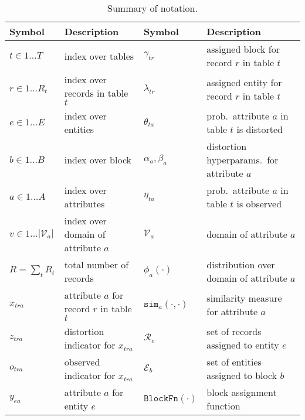 \documentclass[12pt,letterpaper]{article}
\newcommand{\simfn}{\mathtt{sim}} %
\newcommand{\blockfn}{\mathtt{BlockFn}} %
\newcommand{\valset}{\mathcal{V}} %
\newcommand{\entset}{\mathcal{R}} %
\newcommand{\partset}{\mathcal{E}} %
\newcommand{\1}[1]{\mathbb{I}\!\left[#1\right]} %
\def\spacingset#1{\renewcommand{\baselinestretch}%
  {#1}\small\normalsize} \spacingset{1}
\begin{document}
\begin{table}
  \caption{Summary of notation.}
  \label{tbl:notation}
  \begin{center}
  \spacingset{1}
  \footnotesize
  \begin{tabularx}{\linewidth}{@{}l Z @{} l Z@{}}
  	\toprule
  	Symbol                       & Description & Symbol & Description\\
  	\midrule
    $t \in 1 \ldots T$           & index over tables 
    & $\gamma_{tr}$              & assigned block for record $r$ in table $t$ \\
    $r \in 1 \ldots R_t$         & index over records in table $t$ 
    & $\lambda_{tr}$             & assigned entity for record $r$ in table $t$ \\
    $e \in 1 \ldots E$           & index over entities 
    & $\theta_{ta}$              & prob.\ attribute $a$ in table $t$ is distorted\\
    $b \in 1 \ldots B$           & index over block 
    & $\alpha_a, \beta_a$        & distortion hyperparams.\ for attribute $a$ \\
    $a \in 1 \ldots A$           & index over attributes 
    & $\eta_{ta}$                & prob.\ attribute $a$ in table $t$ is observed \\
    $v \in 1 \ldots |\valset_a| $ & index over domain of attribute $a$ 
    & $\valset_a$                & domain of attribute $a$ \\
    $R = \sum_{t} R_t$           & total number of records 
    & $\phi_{a}(\cdot)$          & distribution over domain of attribute $a$ \\
    $x_{tra}$                    & attribute $a$ for record $r$ in table $t$     
    & $\simfn_a(\cdot, \cdot)$   & similarity measure for attribute $a$ \\
    $z_{tra}$                    & distortion indicator for $x_{tra}$ 
    & $\entset_e$                & set of records assigned to entity $e$\\
    $o_{tra}$                    & observed indicator for $x_{tra}$ 
    & $\partset_b$               & set of entities assigned to block $b$ \\     
    $y_{ea}$                     & attribute $a$ for entity $e$ 
    & $\blockfn(\cdot)$           & block assignment function \\
    \bottomrule
  \end{tabularx}
  \end{center}
\end{table}
\end{document}
